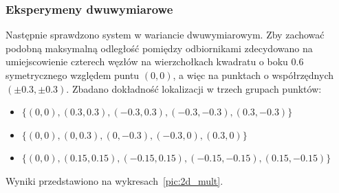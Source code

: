 \subsubsection{Eksperymeny dwuwymiarowe}

Następnie sprawdzono system w wariancie dwuwymiarowym. Zby zachować podobną maksymalną odległość pomiędzy odbiornikami zdecydowano na umiejscowienie czterech węzłów na wierzchołkach kwadratu o boku $0.6$ symetrycznego względem puntu $(0,0)$, a więc na punktach o współrzędnych $(\pm0.3, \pm0.3)$. Zbadano dokładność lokalizacji w trzech grupach punktów:
\begin{itemize}
    \item $\{(0,0), (0.3,0.3), (-0.3,0.3), (-0.3,-0.3), (0.3,-0.3)\}$
    \item $\{(0,0), (0,0.3), (0,-0.3), (-0.3,0), (0.3,0)\}$
    \item $\{(0,0), (0.15,0.15), (-0.15,0.15), (-0.15,-0.15), (0.15,-0.15)\}$
\end{itemize}
Wyniki przedstawiono na wykresach~\ref{pic:2d_mult}.

